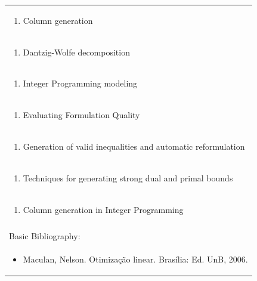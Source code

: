 \documentclass[11pt]{article}
\begin{document}
\begin{center}
\begin{longtable}{|p{4cm}|p{4cm}|p{4cm}|p{4cm}|}
\multicolumn{4}{|p{\dimexpr 16cm + 6\tabcolsep\relax}|}{\begin{enumerate}[start=9]\item Column generation\end{enumerate}}\\
\multicolumn{4}{|p{\dimexpr 16cm + 6\tabcolsep\relax}|}{\begin{enumerate}[start=10]\item Dantzig-Wolfe decomposition\end{enumerate}}\\
\multicolumn{4}{|p{\dimexpr 16cm + 6\tabcolsep\relax}|}{\begin{enumerate}[start=11]\item Integer Programming modeling\end{enumerate}}\\
\multicolumn{4}{|p{\dimexpr 16cm + 6\tabcolsep\relax}|}{\begin{enumerate}[start=12]\item Evaluating Formulation Quality\end{enumerate}}\\
\multicolumn{4}{|p{\dimexpr 16cm + 6\tabcolsep\relax}|}{\begin{enumerate}[start=13]\item Generation of valid inequalities and automatic reformulation\end{enumerate}}\\
\multicolumn{4}{|p{\dimexpr 16cm + 6\tabcolsep\relax}|}{\begin{enumerate}[start=14]\item Techniques for generating strong dual and primal bounds\end{enumerate}}\\
\multicolumn{4}{|p{\dimexpr 16cm + 6\tabcolsep\relax}|}{\begin{enumerate}[start=15]\item Column generation in Integer Programming\end{enumerate}}\\
\multicolumn{4}{|p{\dimexpr 16cm + 6\tabcolsep\relax}|}{}\\
\hline
\multicolumn{4}{|p{16cm}|}{Basic Bibliography:}\\*
\multicolumn{4}{|p{\dimexpr 16cm + 6\tabcolsep\relax}|}{\begin{itemize}\item Maculan, Nelson. Otimização linear. Brasília: Ed. UnB, 2006.\end{itemize}}\\

\end{longtable}
\end{center}
\end{document}
